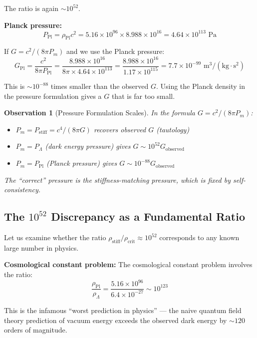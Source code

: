 \documentclass[11pt,a4paper]{article}
\newcommand{\ee}[1]{\times 10^{#1}}
\newcommand{\rhocrit}{\ensuremath{\rho_{\mathrm{crit}}}}
\newcommand{\rhostiff}{\ensuremath{\rho_{\mathrm{stiff}}}}
\newcommand{\rhoPl}{\ensuremath{\rho_{\mathrm{Pl}}}}
\newtheorem{observation}{Observation}
\theoremstyle{definition}
\begin{document}
The ratio is again $\sim 10^{52}$.

\textbf{Planck pressure:}
\begin{equation}
P_{\mathrm{Pl}} = \rhoPl c^2 = 5.16 \ee{96} \times 8.988 \ee{16} = 4.64 \ee{113} \text{ Pa}
\end{equation}

If $G = c^2/(8\pi P_m)$ and we use the Planck pressure:
\begin{equation}
G_{\mathrm{Pl}} = \frac{c^2}{8\pi P_{\mathrm{Pl}}} = \frac{8.988 \ee{16}}{8\pi \times 4.64 \ee{113}} = \frac{8.988 \ee{16}}{1.17 \ee{115}} = 7.7 \ee{-99} \text{ m}^3/(\text{kg}\cdot\text{s}^2)
\end{equation}

This is $\sim 10^{-88}$ times smaller than the observed $G$. Using the Planck density in the pressure formulation gives a $G$ that is far too small.

\begin{observation}[Pressure Formulation Scales]
In the formula $G = c^2/(8\pi P_m)$:
\begin{itemize}
    \item $P_m = P_{\mathrm{stiff}} = c^4/(8\pi G)$ recovers observed $G$ (tautology)
    \item $P_m = P_\Lambda$ (dark energy pressure) gives $G \sim 10^{52} G_{\mathrm{observed}}$
    \item $P_m = P_{\mathrm{Pl}}$ (Planck pressure) gives $G \sim 10^{-88} G_{\mathrm{observed}}$
\end{itemize}
The ``correct'' pressure is the stiffness-matching pressure, which is fixed by self-consistency.
\end{observation}

\subsection{The $10^{52}$ Discrepancy as a Fundamental Ratio}
\label{sec:fundamental_ratio}

Let us examine whether the ratio $\rhostiff/\rhocrit \approx 10^{52}$ corresponds to any known large number in physics.

\textbf{Cosmological constant problem:}
The cosmological constant problem involves the ratio:
\begin{equation}
\frac{\rho_{\mathrm{Pl}}}{\rho_\Lambda} = \frac{5.16 \ee{96}}{6.4 \ee{-27}} \sim 10^{123}
\end{equation}

This is the infamous ``worst prediction in physics'' --- the naive quantum field theory prediction of vacuum energy exceeds the observed dark energy by $\sim 120$ orders of magnitude.
\end{document}
